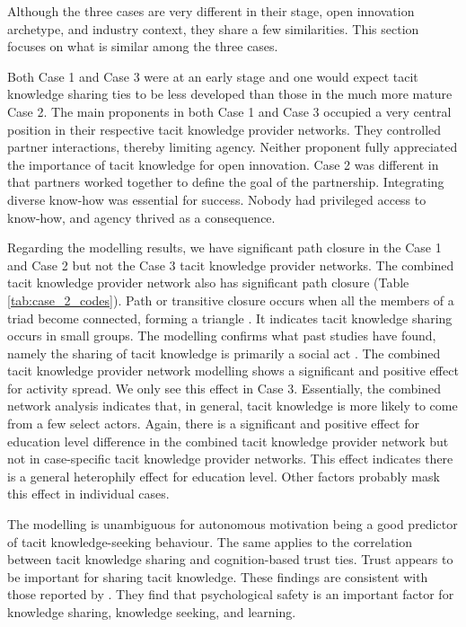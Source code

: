 Although the three cases are very different in their stage, open innovation archetype, and industry context, they share a few similarities. This section focuses on what is similar among the three cases. \medskip

Both Case 1 and Case 3 were at an early stage and one would expect tacit knowledge sharing ties to be less developed than those in the much more mature Case 2. The main proponents in both Case 1 and Case 3 occupied a very central position in their respective tacit knowledge provider networks. They controlled partner interactions, thereby limiting agency. Neither proponent fully appreciated the importance of tacit knowledge for open innovation. Case 2 was different in that partners worked together to define the goal of the partnership. Integrating diverse know-how was essential for success. Nobody had privileged access to know-how, and agency thrived as a consequence. \medskip

Regarding the modelling results, we have significant path closure in the Case 1 and Case 2 but not the Case 3 tacit knowledge provider networks. The combined tacit knowledge provider network also has significant path closure (Table \ref{tab:case_2_codes}). Path or transitive closure occurs when all the members of a triad become connected, forming a triangle \citep{yin2020measuring}. It indicates tacit knowledge sharing occurs in small groups. The modelling confirms what past studies have found, namely the sharing of tacit knowledge is primarily a social act \citep{nonaka1994dynamic,kaser2001knowledge,zhang2016critical}. The combined tacit knowledge provider network modelling shows a significant and positive effect for activity spread. We only see this effect in Case 3. Essentially, the combined network analysis indicates that, in general, tacit knowledge is more likely to come from a few select actors. Again, there is a significant and positive effect for education level difference in the combined tacit knowledge provider network but not in case-specific tacit knowledge provider networks. This effect indicates there is a general heterophily effect for education level. Other factors probably mask this effect in individual cases. \medskip

The modelling is unambiguous for autonomous motivation being a good predictor of tacit knowledge-seeking behaviour. The same applies to the correlation between tacit knowledge sharing and cognition-based trust ties. Trust appears to be important for sharing tacit knowledge. These findings are consistent with those reported by \citet{gubbins2021delineating}. They find that psychological safety is an important factor for knowledge sharing, knowledge seeking, and learning. \medskip


